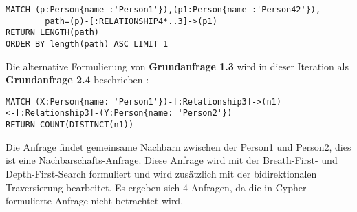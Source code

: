 \begin{Verbatim}[frame=single]
MATCH (p:Person{name :'Person1'}),(p1:Person{name :'Person42'}),
		path=(p)-[:RELATIONSHIP4*..3]->(p1) 
RETURN LENGTH(path)
ORDER BY length(path) ASC LIMIT 1
\end{Verbatim}
Die alternative Formulierung von \textbf{Grundanfrage 1.3} wird in dieser Iteration als \textbf{Grundanfrage 2.4}  beschrieben :
\begin{Verbatim}[frame=single]
MATCH (X:Person{name: 'Person1'})-[:Relationship3]->(n1)
<-[:Relationship3]-(Y:Person{name: 'Person2'})
RETURN COUNT(DISTINCT(n1))
\end{Verbatim}
Die Anfrage findet gemeinsame Nachbarn zwischen der Person1 und Person2, dies ist eine  Nachbarschafts-Anfrage. Diese Anfrage wird mit der Breath-First- und Depth-First-Search formuliert und   wird zusätzlich mit der bidirektionalen Traversierung bearbeitet. Es ergeben sich 4 Anfragen, da die in Cypher formulierte Anfrage nicht betrachtet wird. 
